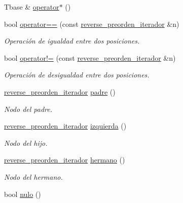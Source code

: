 \begin{DoxyCompactItemize}
Tbase \& \hyperlink{classArbolGeneral_1_1reverse__preorden__iterador_a159fd764b91fefacaece5c8c4cbb66fb}{operator$\ast$} ()
\item 
bool \hyperlink{classArbolGeneral_1_1reverse__preorden__iterador_a9ed2cebf9531952f629c3f3f20eccb3d}{operator==} (const \hyperlink{classArbolGeneral_1_1reverse__preorden__iterador}{reverse\+\_\+preorden\+\_\+iterador} \&n)
\begin{DoxyCompactList}\small\item\em Operación de igualdad entre dos posiciones. \end{DoxyCompactList}\item 
bool \hyperlink{classArbolGeneral_1_1reverse__preorden__iterador_a908b03ace52ea925b7592b7b45814822}{operator!=} (const \hyperlink{classArbolGeneral_1_1reverse__preorden__iterador}{reverse\+\_\+preorden\+\_\+iterador} \&n)
\begin{DoxyCompactList}\small\item\em Operación de desigualdad entre dos posiciones. \end{DoxyCompactList}\item 
\hyperlink{classArbolGeneral_1_1reverse__preorden__iterador}{reverse\+\_\+preorden\+\_\+iterador} \hyperlink{classArbolGeneral_1_1reverse__preorden__iterador_a3b80852dfc52aba8b888246f81c8ca6d}{padre} ()
\begin{DoxyCompactList}\small\item\em Nodo del padre. \end{DoxyCompactList}\item 
\hyperlink{classArbolGeneral_1_1reverse__preorden__iterador}{reverse\+\_\+preorden\+\_\+iterador} \hyperlink{classArbolGeneral_1_1reverse__preorden__iterador_a330e28fcf945bdd4034706be1bc7261a}{izquierda} ()
\begin{DoxyCompactList}\small\item\em Nodo del hijo. \end{DoxyCompactList}\item 
\hyperlink{classArbolGeneral_1_1reverse__preorden__iterador}{reverse\+\_\+preorden\+\_\+iterador} \hyperlink{classArbolGeneral_1_1reverse__preorden__iterador_a6af3b59622656609904b308c7b5532b4}{hermano} ()
\begin{DoxyCompactList}\small\item\em Nodo del hermano. \end{DoxyCompactList}\item 
bool \hyperlink{classArbolGeneral_1_1reverse__preorden__iterador_ae2f6fe815da3cd60b18623dc519166c3}{nulo} ()

\end{DoxyCompactItemize}
